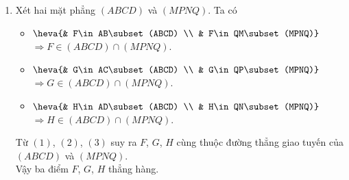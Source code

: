 \begin{bt}
\begin{bt}
{\begin{enumerate}
			$\Rightarrow Q=SA\cap (MNP)$.
			\item Xét hai mặt phẳng $(ABCD)$ và $(MPNQ)$. Ta có
			\begin{itemize}
				\item $\heva{& F\in AB\subset (ABCD) \\ & F\in QM\subset (MPNQ)}$\\
				$\Rightarrow F\in (ABCD)\cap (MPNQ).$ 
				\item $\heva{& G\in AC\subset (ABCD) \\ & G\in QP\subset (MPNQ)}$\\
				$\Rightarrow G\in (ABCD)\cap (MPNQ).$ 
				\item $\heva{& H\in AD\subset (ABCD) \\ & H\in QN\subset (MPNQ)}$\\
				$\Rightarrow H\in (ABCD)\cap (MPNQ).$ 
			\end{itemize}
			Từ $(1)$, $(2)$, $(3)$ suy ra $F$, $G$, $H$ cùng thuộc đường thẳng giao tuyến của $(ABCD)$ và $(MPNQ)$.\\
			Vậy ba điểm $F$, $G$, $H$ thẳng hàng.
		\end{enumerate}
	}
\end{bt}


\end{bt}
